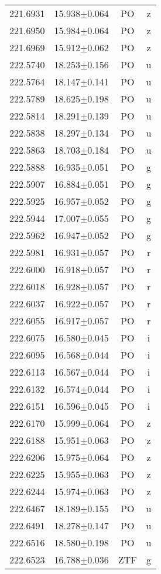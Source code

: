 \begin{table}
\begin{tabular}{cccc}
221.6931 & 15.938$\pm$0.064 & PO & z \\
221.6950 & 15.984$\pm$0.064 & PO & z \\
221.6969 & 15.912$\pm$0.062 & PO & z \\
222.5740 & 18.253$\pm$0.156 & PO & u \\
222.5764 & 18.147$\pm$0.141 & PO & u \\
222.5789 & 18.625$\pm$0.198 & PO & u \\
222.5814 & 18.291$\pm$0.139 & PO & u \\
222.5838 & 18.297$\pm$0.134 & PO & u \\
222.5863 & 18.703$\pm$0.184 & PO & u \\
222.5888 & 16.935$\pm$0.051 & PO & g \\
222.5907 & 16.884$\pm$0.051 & PO & g \\
222.5925 & 16.957$\pm$0.052 & PO & g \\
222.5944 & 17.007$\pm$0.055 & PO & g \\
222.5962 & 16.947$\pm$0.052 & PO & g \\
222.5981 & 16.931$\pm$0.057 & PO & r \\
222.6000 & 16.918$\pm$0.057 & PO & r \\
222.6018 & 16.928$\pm$0.057 & PO & r \\
222.6037 & 16.922$\pm$0.057 & PO & r \\
222.6055 & 16.917$\pm$0.057 & PO & r \\
222.6075 & 16.580$\pm$0.045 & PO & i \\
222.6095 & 16.568$\pm$0.044 & PO & i \\
222.6113 & 16.567$\pm$0.044 & PO & i \\
222.6132 & 16.574$\pm$0.044 & PO & i \\
222.6151 & 16.596$\pm$0.045 & PO & i \\
222.6170 & 15.999$\pm$0.064 & PO & z \\
222.6188 & 15.951$\pm$0.063 & PO & z \\
222.6206 & 15.975$\pm$0.064 & PO & z \\
222.6225 & 15.955$\pm$0.063 & PO & z \\
222.6244 & 15.974$\pm$0.063 & PO & z \\
222.6467 & 18.189$\pm$0.155 & PO & u \\
222.6491 & 18.278$\pm$0.147 & PO & u \\
222.6516 & 18.580$\pm$0.198 & PO & u \\
222.6523 & 16.788$\pm$0.036 & ZTF & g \\

\end{tabular}
\end{table}
